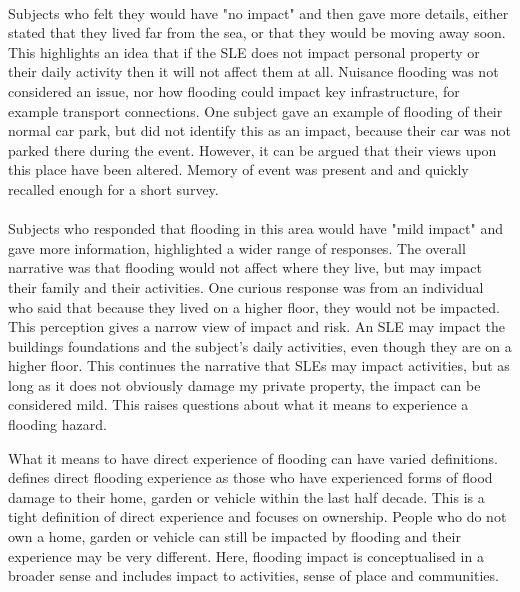 \paragraph{}

Subjects who felt they would have "no impact" and then gave more details, either stated that they lived far from the sea, or that they would be moving away soon. This highlights an idea that if the SLE does not impact personal property or their daily activity then it will not affect them at all. Nuisance flooding was not considered an issue, nor how flooding could impact key infrastructure, for example transport connections. One subject gave an example of flooding of their normal car park, but did not identify this as an impact, because their car was not parked there during the event. However, it can be argued that their views upon this place have been altered. Memory of event was present and and quickly recalled enough for a short survey.  
\paragraph{}

Subjects who responded that flooding in this area would have "mild impact" and gave more information, highlighted a wider range of responses. The overall narrative was that flooding would not affect where they live, but may impact their family and their activities. One curious response was from an individual who said that because they lived on a higher floor, they would not be impacted. This perception gives a narrow view of impact and risk. An SLE may impact the buildings foundations and the subject's daily activities, even though they are on a higher floor. This continues the narrative that SLEs may impact activities, but as long as it does not obviously damage my private property, the impact can be considered mild. This raises questions about what it means to experience a flooding hazard. 

What it means to have direct experience of flooding can have varied definitions. \cite{whitmarsh_are_2008} defines direct flooding experience as those who have experienced forms of flood damage to their home, garden or vehicle within the last half decade. This is a tight definition of direct experience and focuses on ownership. People who do not own a home, garden or vehicle can still be impacted by flooding and their experience may be very different. Here, flooding impact is conceptualised in a broader sense and includes impact to activities, sense of place and communities.   
